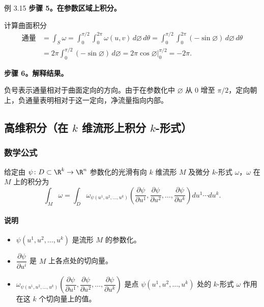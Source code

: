 \begin{statement}{例 3.15}{}
\noindent\textbf{步骤 5。在参数区域上积分。}\par
计算曲面积分%
%
\begin{align*}
  \text{通量}&=\int_S\omega
   =\int_0^{\pi/2}\int_0^{2\pi}\omega(u,v)\,d\varnothing\,d\theta
   =\int_0^{\pi/2}\int_0^{2\pi}(-\sin\varnothing)\,d\varnothing\,d\theta\\
   &=2\pi\int_0^{\pi/2}(-\sin\varnothing)\,d\varnothing
   =\left.2\pi\cos\varnothing\right|_0^{\pi/2}=-2\pi.
\end{align*}

\noindent\textbf{步骤 6。解释结果。}\par
负号表示通量相对于曲面定向的方向。由于在参数化中 $\varnothing$ 从 $0$ 增至 $\pi/2$，定向朝上，负通量表明相对于这一定向，净流量指向内部。
\end{statement}

\subsection{高维积分（在 \texorpdfstring{$k$}{k} 维流形上积分 \texorpdfstring{$k$}{k}-形式）}
\subsubsection{数学公式}
给定由 $\psi\colon D\subset\R^k\to\R^n$ 参数化的光滑有向 $k$ 维流形 $M$ 及微分 $k$-形式 $\omega$，$\omega$ 在 $M$ 上的积分为
\[
  \int_M\omega=\int_D\omega_{\psi(u^1,u^2,\dots,u^k)}
  \left(\frac{\partial\psi}{\partial u^1},\frac{\partial\psi}{\partial u^2},
  \dots,\frac{\partial\psi}{\partial u^k}\right)du^1\cdots du^k.
\]

\paragraph{说明}
\begin{itemize}
\item $\psi(u^1,u^2,\dots,u^k)$ 是流形 $M$ 的参数化。
\item $\dfrac{\partial\psi}{\partial u^i}$ 是 $M$ 上各点处的切向量。
\item $\omega_{\psi(u^1,u^2,\dots,u^k)}
  \left(\dfrac{\partial\psi}{\partial u^1},\dfrac{\partial\psi}{\partial u^2},
  \dots,\dfrac{\partial\psi}{\partial u^k}\right)$ 是点 $\psi(u^1,u^2,\dots,u^k)$
  处的 $k$-形式 $\omega$ 作用在这 $k$ 个切向量上的值。
\end{itemize}


